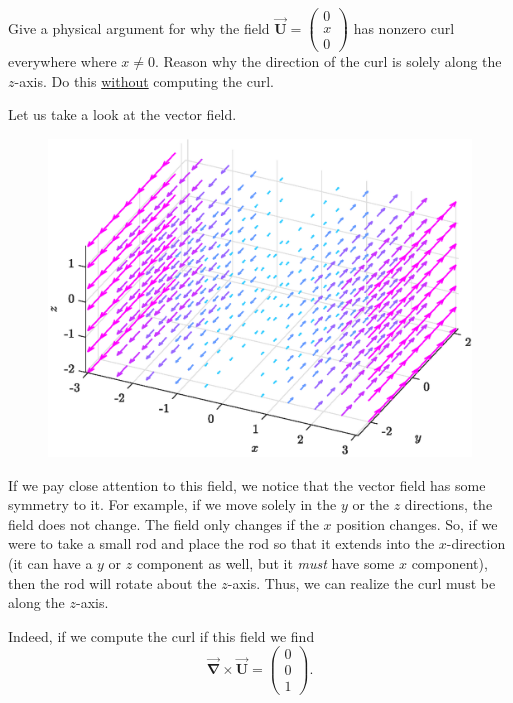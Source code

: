 \documentclass[12pt]{article} %
\newcommand{\grad}{\boldsymbol{\vec{\nabla}}}
\newcommand{\vecfieldU}{\boldsymbol{\vec{U}}}
\begin{document}
\newpage
\begin{problem}
    Give a physical argument for why the field $\vecfieldU = \begin{pmatrix} 0 \\ x \\ 0 \end{pmatrix}$ has nonzero curl everywhere where $x\neq 0$. Reason why the direction of the curl is solely along the $z$-axis.  Do this \underline{without} computing the curl.
\end{problem}
\begin{solution}
Let us take a look at the vector field.
\begin{figure}[h]
    \centering
    \includegraphics[width=.65\textwidth]{figures/6}
\end{figure}
If we pay close attention to this field, we notice that the vector field has some symmetry to it. For example, if we move solely in the $y$ or the $z$ directions, the field does not change. The field only changes if the $x$ position changes. So, if we were to take a small rod and place the rod so that it extends into the $x$-direction (it can have a $y$ or $z$ component as well, but it \emph{must} have some $x$ component), then the rod will rotate about the $z$-axis. Thus, we can realize the curl must be along the $z$-axis. 

Indeed, if we compute the curl if this field we find
\[
\grad \times \vecfieldU = \begin{pmatrix} 0 \\ 0 \\ 1 \end{pmatrix}.
\]
\end{solution}
\end{document}
